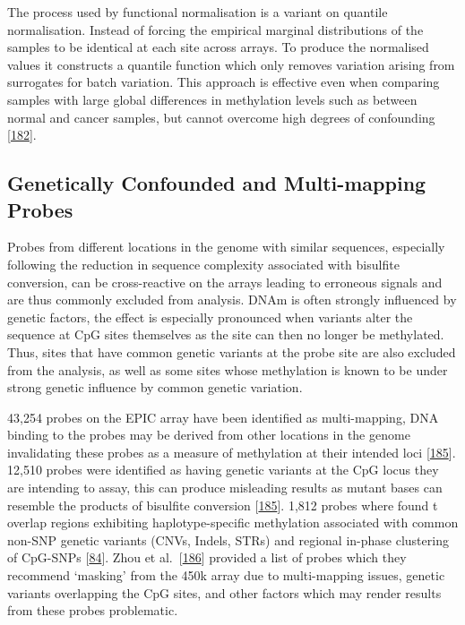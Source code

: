 \documentclass[
]{book}
\begin{document}
The process used by functional normalisation is a variant on quantile normalisation.
Instead of forcing the empirical marginal distributions of the samples to be identical at each site across arrays. To produce the normalised values it constructs a quantile function which only removes variation arising from surrogates for batch variation.
This approach is effective even when comparing samples with large global differences in methylation levels such as between normal and cancer samples, but cannot overcome high degrees of confounding {[}\protect\hyperlink{ref-Fortin2014}{182}{]}.

\hypertarget{genetically-confounded-and-multi-mapping-probes}{%
\subsection{Genetically Confounded and Multi-mapping Probes}\label{genetically-confounded-and-multi-mapping-probes}}

Probes from different locations in the genome with similar sequences, especially following the reduction in sequence complexity associated with bisulfite conversion, can be cross-reactive on the arrays leading to erroneous signals and are thus commonly excluded from analysis.
DNAm is often strongly influenced by genetic factors, the effect is especially pronounced when variants alter the sequence at CpG sites themselves as the site can then no longer be methylated.
Thus, sites that have common genetic variants at the probe site are also excluded from the analysis, as well as some sites whose methylation is known to be under strong genetic influence by common genetic variation.

43,254 probes on the EPIC array have been identified as multi-mapping, DNA binding to the probes may be derived from other locations in the genome invalidating these probes as a measure of methylation at their intended loci {[}\protect\hyperlink{ref-Pidsley2016}{185}{]}.
12,510 probes were identified as having genetic variants at the CpG locus they are intending to assay, this can produce misleading results as mutant bases can resemble the products of bisulfite conversion {[}\protect\hyperlink{ref-Pidsley2016}{185}{]}.
1,812 probes where found t overlap regions exhibiting haplotype-specific methylation associated with common non-SNP genetic variants (CNVs, Indels, STRs) and regional in-phase clustering of CpG-SNPs {[}\protect\hyperlink{ref-Bell2017a}{84}{]}.
Zhou et al.~{[}\protect\hyperlink{ref-Zhou2017}{186}{]} provided a list of probes which they recommend `masking' from the 450k array due to multi-mapping issues, genetic variants overlapping the CpG sites, and other factors which may render results from these probes problematic.
\end{document}
